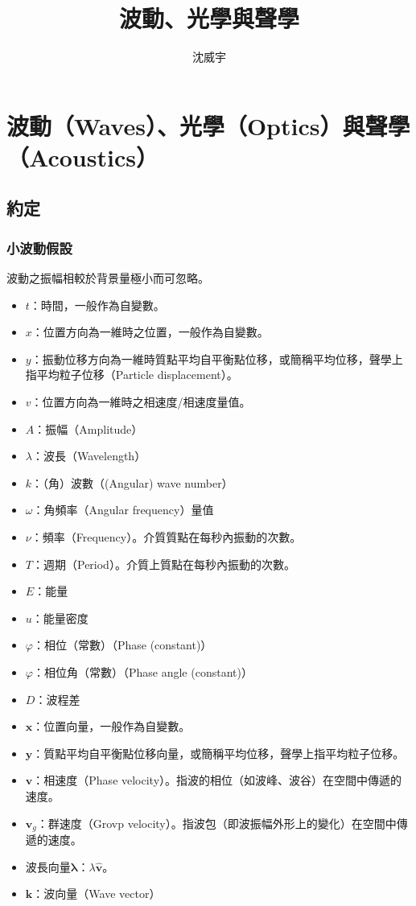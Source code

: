 \documentclass[a4paper,12pt]{report}
\begin{document}
\title{波動、光學與聲學}
\author{沈威宇}
\date{\temtoday}
\titletocdoc
\chapter{波動（Waves）、光學（Optics）與聲學（Acoustics）}
\section{約定}
\subsection{小波動假設}
波動之振幅相較於背景量極小而可忽略。
\begin{itemize}
\item $t$：時間，一般作為自變數。
\item $x$：位置方向為一維時之位置，一般作為自變數。
\item $y$：振動位移方向為一維時質點平均自平衡點位移，或簡稱平均位移，聲學上指平均粒子位移（Particle displacement）。
\item $v$：位置方向為一維時之相速度/相速度量值。
\item $A$：振幅（Amplitude）
\item $\lambda$：波長（Wavelength）
\item $k$：（角）波數（(Angular) wave number）
\item $\omega$：角頻率（Angular frequency）量值
\item $\nu$：頻率（Frequency）。介質質點在每秒內振動的次數。
\item $T$：週期（Period）。介質上質點在每秒內振動的次數。
\item $E$：能量
\item $u$：能量密度
\item $\varphi$：相位（常數）（Phase (constant)）
\item $\varphi$：相位角（常數）（Phase angle (constant)）
\item $D$：波程差
\end{itemize}
\begin{itemize}
\item $\mathbf{x}$：位置向量，一般作為自變數。
\item $\mathbf{y}$：質點平均自平衡點位移向量，或簡稱平均位移，聲學上指平均粒子位移。
\item $\mathbf{v}$：相速度（Phase velocity）。指波的相位（如波峰、波谷）在空間中傳遞的速度。
\item $\mathbf{v}_g$：群速度（Grovp velocity）。指波包（即波振幅外形上的變化）在空間中傳遞的速度。
\item 波長向量$\mathbf{\lambda}$：$\lambda\hat{\mathbf{v}}$。
\item $\mathbf{k}$：波向量（Wave vector）
\end{itemize}
\end{document}
